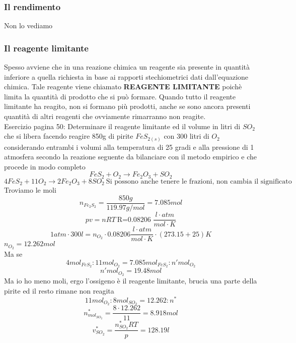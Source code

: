 \documentclass{article}
\begin{document}
\subsubsection{Il rendimento}
Non lo vediamo
\subsubsection{Il reagente limitante}
Spesso avviene che in una reazione chimica un reagente sia presente in quantità inferiore
a quella richiesta in base ai rapporti stechiometrici dati dall'equazione chimica.
Tale reagente viene chiamato \textbf{REAGENTE LIMITANTE} poichè limita la quantità di prodotto che si 
può formare. Quando tutto il reagente limitante ha reagito, non si formano più prodotti, anche se sono 
ancora presenti quantità di altri reagenti che ovviamente rimarranno non reagite.\\
Esercizio pagina 50: Determinare il reagente limitante ed il volume in litri di $SO_2$ che si libera
facendo reagire 850g di pirite $FeS_{2(s)}$ con 300 litri di $O_2$ considerando entrambi i volumi alla temperatura
di 25 gradi e alla pressione di 1 atmosfera secondo la reazione seguente da bilanciare con il metodo empirico e che procede in modo completo
\[FeS_2 + O_2 \rightarrow Fe_2O_3 + SO_2\]
\[4FeS_2 + 11O_2 \rightarrow 2Fe_2O_3 + 8SO_2 \ \text{Si possono anche tenere le frazioni, non cambia il significato}\]
Troviamo le moli
\[n_{Fe_2S_2} = \frac{850g}{119.97 g/mol} = 7.085 mol\]
\[pv = nRT \ \text{R=0.08206 $\frac{l\cdot atm}{mol \cdot K}$}\]
\[1atm\cdot 300l = n_{O_2} \cdot 0.08206\frac{l\cdot atm}{mol \cdot K} \cdot (273.15+25) K\]
$n_{O_2}= 12.262 mol$\\
Ma se
\[4mol_{FeS_2} : 11mol_{O_2} = 7.085mol_{FeS_2} : n'mol_{O_2}\]
\[n'mol_{O_2}= 19.48mol\]
Ma io ho meno moli, ergo l'ossigeno è il reagente limitante, brucia una parte della pirite ed il resto rimane non reagita
\[11mol_{O_2} : 8mol_{SO_2} = 12.262 : n^*\]
\[n^*_{mol_{SO_2}}= \frac{8\cdot 12.262}{11} = 8.918 mol\]
\[v^*_{SO_2}= \frac{n^*_{SO_2}RT}{p} = 128.19 l\]
\end{document}
